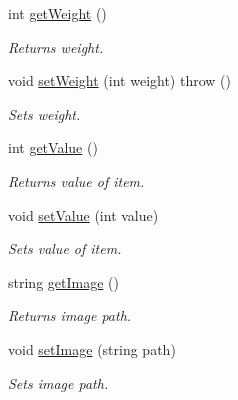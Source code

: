 \begin{DoxyCompactItemize}
\hypertarget{class_item_a56817af92c3db19016949b3277c83dca}{}\label{class_item_a56817af92c3db19016949b3277c83dca} 
int \hyperlink{class_item_a56817af92c3db19016949b3277c83dca}{get\+Weight} ()
\begin{DoxyCompactList}\small\item\em Returns weight. \end{DoxyCompactList}\item 
\hypertarget{class_item_a00bbb472ea4fd7faeafc2a3e07729bab}{}\label{class_item_a00bbb472ea4fd7faeafc2a3e07729bab} 
void \hyperlink{class_item_a00bbb472ea4fd7faeafc2a3e07729bab}{set\+Weight} (int weight)  throw ()
\begin{DoxyCompactList}\small\item\em Sets weight. \end{DoxyCompactList}\item 
\hypertarget{class_item_a9ceb9a0df0efe18d23e347471f908be7}{}\label{class_item_a9ceb9a0df0efe18d23e347471f908be7} 
int \hyperlink{class_item_a9ceb9a0df0efe18d23e347471f908be7}{get\+Value} ()
\begin{DoxyCompactList}\small\item\em Returns value of item. \end{DoxyCompactList}\item 
\hypertarget{class_item_adaa9513af7a2f17488c5e7317d2b8e08}{}\label{class_item_adaa9513af7a2f17488c5e7317d2b8e08} 
void \hyperlink{class_item_adaa9513af7a2f17488c5e7317d2b8e08}{set\+Value} (int value)
\begin{DoxyCompactList}\small\item\em Sets value of item. \end{DoxyCompactList}\item 
\hypertarget{class_item_abafe93fe7bf198b5c208e095fca704b4}{}\label{class_item_abafe93fe7bf198b5c208e095fca704b4} 
string \hyperlink{class_item_abafe93fe7bf198b5c208e095fca704b4}{get\+Image} ()
\begin{DoxyCompactList}\small\item\em Returns image path. \end{DoxyCompactList}\item 
\hypertarget{class_item_ab2e28b59d2374b114cd4baa60fb9dd2a}{}\label{class_item_ab2e28b59d2374b114cd4baa60fb9dd2a} 
void \hyperlink{class_item_ab2e28b59d2374b114cd4baa60fb9dd2a}{set\+Image} (string path)
\begin{DoxyCompactList}\small\item\em Sets image path. \end{DoxyCompactList}\item 

\end{DoxyCompactItemize}
